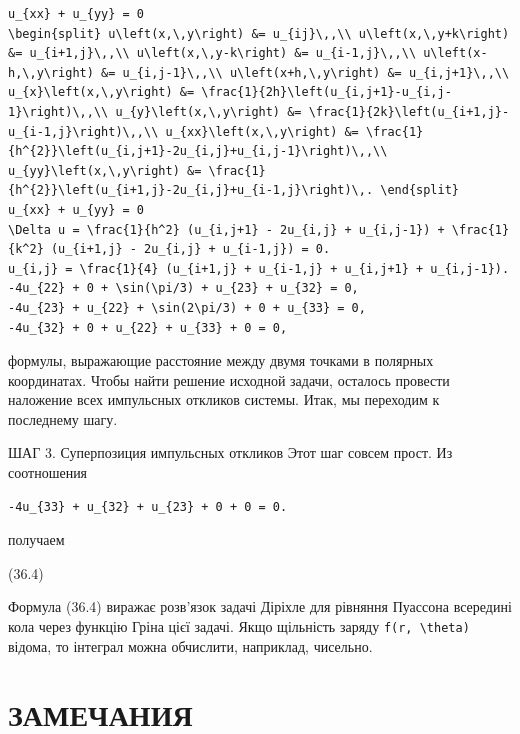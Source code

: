 \documentclass[
  ukrainian,
]{article}
\begin{document}
\begin{verbatim}
u_{xx} + u_{yy} = 0
\begin{split} u\left(x,\,y\right) &= u_{ij}\,,\\ u\left(x,\,y+k\right) &= u_{i+1,j}\,,\\ u\left(x,\,y-k\right) &= u_{i-1,j}\,,\\ u\left(x-h,\,y\right) &= u_{i,j-1}\,,\\ u\left(x+h,\,y\right) &= u_{i,j+1}\,,\\ u_{x}\left(x,\,y\right) &= \frac{1}{2h}\left(u_{i,j+1}-u_{i,j-1}\right)\,,\\ u_{y}\left(x,\,y\right) &= \frac{1}{2k}\left(u_{i+1,j}-u_{i-1,j}\right)\,,\\ u_{xx}\left(x,\,y\right) &= \frac{1}{h^{2}}\left(u_{i,j+1}-2u_{i,j}+u_{i,j-1}\right)\,,\\ u_{yy}\left(x,\,y\right) &= \frac{1}{h^{2}}\left(u_{i+1,j}-2u_{i,j}+u_{i-1,j}\right)\,. \end{split}
u_{xx} + u_{yy} = 0
\Delta u = \frac{1}{h^2} (u_{i,j+1} - 2u_{i,j} + u_{i,j-1}) + \frac{1}{k^2} (u_{i+1,j} - 2u_{i,j} + u_{i-1,j}) = 0.
u_{i,j} = \frac{1}{4} (u_{i+1,j} + u_{i-1,j} + u_{i,j+1} + u_{i,j-1}).
-4u_{22} + 0 + \sin(\pi/3) + u_{23} + u_{32} = 0,
-4u_{23} + u_{22} + \sin(2\pi/3) + 0 + u_{33} = 0,
-4u_{32} + 0 + u_{22} + u_{33} + 0 = 0,
\end{verbatim}

формулы, выражающие расстояние между двумя точками в полярных
координатах. Чтобы найти решение исходной задачи, осталось провести
наложение всех импульсных откликов системы. Итак, мы переходим к
последнему шагу.

ШАГ 3. Суперпозиция импульсных откликов Этот шаг совсем прост. Из
соотношения

\begin{verbatim}
-4u_{33} + u_{32} + u_{23} + 0 + 0 = 0.
\end{verbatim}

получаем

(36.4)

Формула (36.4) виражає розв'язок задачі Діріхле для рівняння Пуассона
всередині кола через функцію Гріна цієї задачі. Якщо щільність заряду
\texttt{f(r,\ \textbackslash{}theta)} відома, то інтеграл можна
обчислити, наприклад, чисельно.

\section{ЗАМЕЧАНИЯ}\label{ux437ux430ux43cux435ux447ux430ux43dux438ux44f-2}
\end{document}
